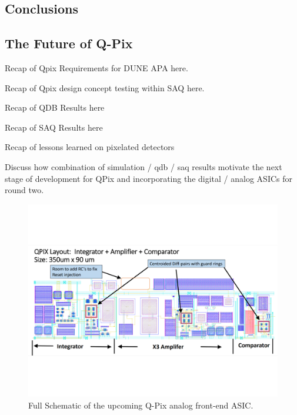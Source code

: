 \subsection{Conclusions}

\subsection{The Future of Q-Pix}

Recap of Qpix Requirements for DUNE APA here.

Recap of Qpix design concept testing within SAQ here.

Recap of QDB Results here

Recap of SAQ Results here

Recap of lessons learned on pixelated detectors

Discuss how combination of simulation / qdb / saq results motivate the next stage of development for QPix and incorporating the digital / analog ASICs for round two.

\begin{figure}[]
\centering
\includegraphics[width=\textwidth]{images/upcoming_qpix_ASIC.pdf}
\caption{Full Schematic of the upcoming Q-Pix analog front-end ASIC.}
\end{figure}